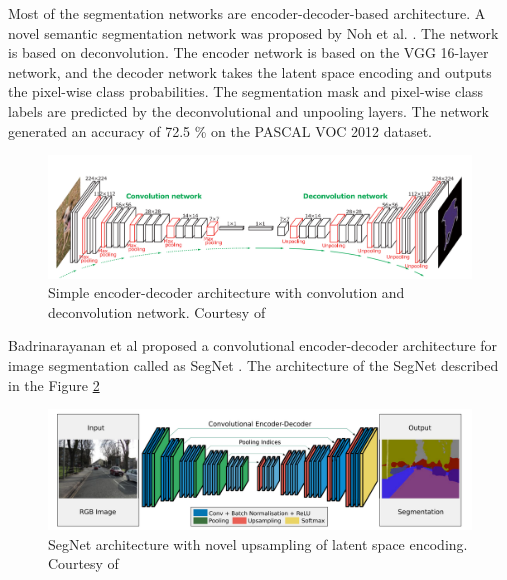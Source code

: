 	Most of the segmentation networks are encoder-decoder-based architecture. A novel semantic segmentation network was proposed by Noh et al. \cite{64_noh2015learning}. The network is based on deconvolution. The encoder network is based on the VGG 16-layer network, and the decoder network takes the latent space encoding and outputs the pixel-wise class probabilities. The segmentation mask and pixel-wise class labels are predicted by the deconvolutional and unpooling layers. The network generated an accuracy of 72.5 \% on the PASCAL VOC 2012 dataset. 
    
    \begin{figure}[h]
    	\centering
    	\includegraphics[width=14cm]{images/general_seg.png}
    	\caption{Simple encoder-decoder architecture with convolution and deconvolution network. Courtesy of \cite{64_noh2015learning}}
    	\label{fig:general_seg}
    \end{figure} 
    
    Badrinarayanan et al proposed a convolutional encoder-decoder architecture for image segmentation called as SegNet \cite{62_badrinarayanan2017segnet}. The architecture of the SegNet described in the Figure \ref{fig:segnet}  
    
    \begin{figure}[h]
    	\centering
    	\includegraphics[width=14cm]{images/segnet.png}
    	\caption{SegNet architecture with novel upsampling of latent space encoding. Courtesy of \cite{62_badrinarayanan2017segnet}}
    	\label{fig:segnet}
    \end{figure} 
    
